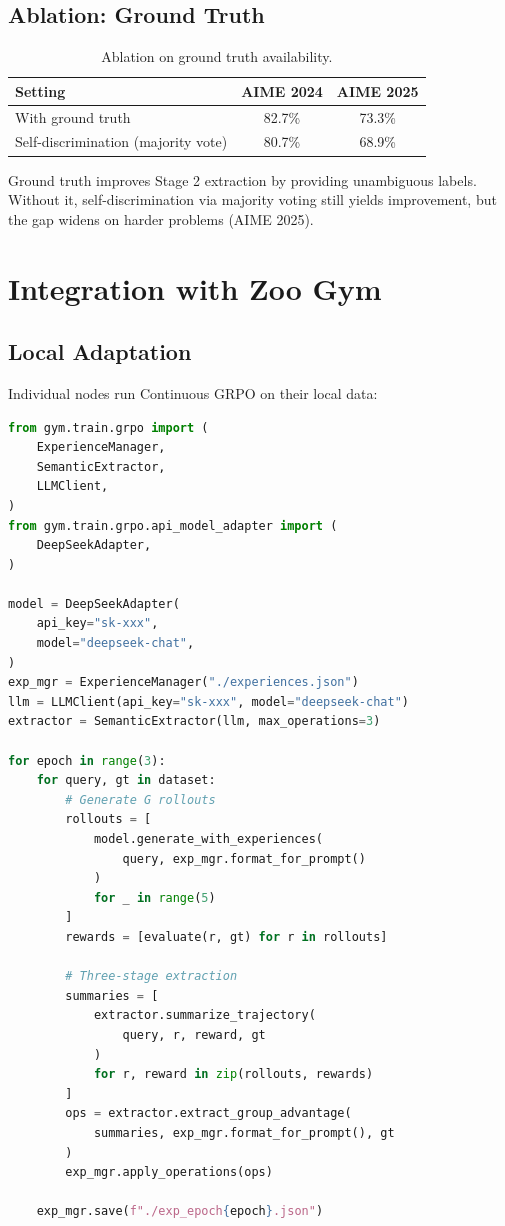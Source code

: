 \documentclass[11pt,letterpaper]{article}
\begin{document}
\subsection{Ablation: Ground Truth}

\begin{table}[t]
\centering
\begin{tabular}{lcc}
\toprule
\textbf{Setting} & \textbf{AIME 2024} & \textbf{AIME 2025} \\
\midrule
With ground truth & 82.7\% & 73.3\% \\
Self-discrimination (majority vote) & 80.7\% & 68.9\% \\
\bottomrule
\end{tabular}
\caption{Ablation on ground truth availability.}
\label{tab:ablation-gt}
\end{table}

Ground truth improves Stage 2 extraction by providing unambiguous labels.  Without it, self-discrimination via majority voting still yields improvement, but the gap widens on harder problems (AIME 2025).

\section{Integration with Zoo Gym}
\label{sec:integration}

\subsection{Local Adaptation}

Individual nodes run Continuous GRPO on their local data:

\begin{lstlisting}[language=python,caption=Local Continuous GRPO training]
from gym.train.grpo import (
    ExperienceManager,
    SemanticExtractor,
    LLMClient,
)
from gym.train.grpo.api_model_adapter import (
    DeepSeekAdapter,
)

model = DeepSeekAdapter(
    api_key="sk-xxx",
    model="deepseek-chat",
)
exp_mgr = ExperienceManager("./experiences.json")
llm = LLMClient(api_key="sk-xxx", model="deepseek-chat")
extractor = SemanticExtractor(llm, max_operations=3)

for epoch in range(3):
    for query, gt in dataset:
        # Generate G rollouts
        rollouts = [
            model.generate_with_experiences(
                query, exp_mgr.format_for_prompt()
            )
            for _ in range(5)
        ]
        rewards = [evaluate(r, gt) for r in rollouts]

        # Three-stage extraction
        summaries = [
            extractor.summarize_trajectory(
                query, r, reward, gt
            )
            for r, reward in zip(rollouts, rewards)
        ]
        ops = extractor.extract_group_advantage(
            summaries, exp_mgr.format_for_prompt(), gt
        )
        exp_mgr.apply_operations(ops)

    exp_mgr.save(f"./exp_epoch{epoch}.json")
\end{lstlisting}
\end{document}
